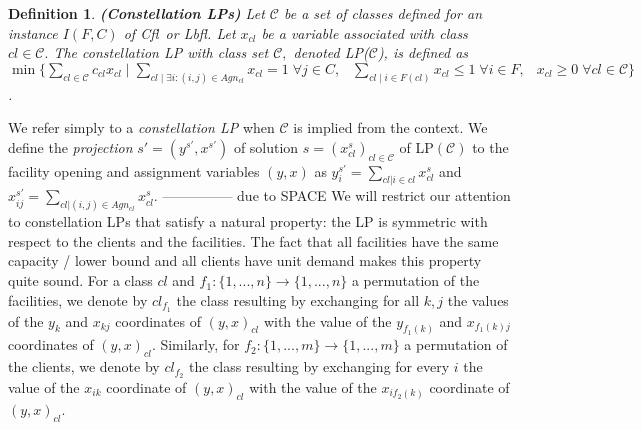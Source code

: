 \documentclass[11pt]{article}
\newtheorem{definition}{Definition}[section]
\newcommand{\lbfl}{{\sc Lbfl}}
\newcommand{\cfl}{{\sc Cfl}}
\begin{document}
\vspace*{-0.05cm}
\begin{sloppypar}
\begin{definition}  {\bf (Constellation LPs)} \label{def:constell}
Let $\mathcal{C}$ be a set of classes defined for an instance $I(F,C)$
of \cfl\ or \lbfl. Let $x_{cl}$  be a variable associated with class $cl \in
\mathcal{C}.$
The {\em  constellation LP with class set}
  $\mathcal{C},$ denoted LP($\mathcal{C}$),  is defined as $\min \{
\sum_{cl \in \mathcal{C}} c_{cl}x_{cl} \mid \sum_{{cl} \mid  \exists
  i:(i,j) \in  Agn_{cl}} x_{cl}=1  \; \forall j \in C, \:\;\; \sum_{{cl} \mid
  i  \in  F({cl})} x_{cl} \leq 1 \; \forall i \in F,  \:\;\;  x_{cl} \geq 0
\; \forall cl \in \mathcal{C} \}$.


\begin{comment}
\[ \min \{ \sum_{cl \in \mathcal{C}} c_{cl}x_{cl}  \mid \sum_{{cl} \mid  \exists i:(i,j) \in  Agn_{cl}}
x_{cl}=1  \; \forall j \in C,   \;\;\; 
\sum_{{cl} \mid  i  \in  F({cl})} x_{cl} \leq 1 
\; \forall i \in F,  \;\;\;  
 x_{cl} \geq 0   \; \forall cl \in \mathcal{C}  \}
\]
\end{comment}
\end{definition}
\end{sloppypar}
\vspace*{-0.03cm}


\noindent 
We  refer simply to a {\em constellation LP} when
$\mathcal{C}$ is implied from the context.  
We define the \emph{projection} $s'=(y^{s'}, x^{s'})$ of solution $s=(x^s_{cl})_{cl \in \mathcal{C}}$ 
of  LP$(\mathcal{C})$ to the  facility opening
and assignment variables $(y,x)$ as $y_i^{s'}=\sum_{cl|i\in cl}x_{cl}^{s}$ and 
$x_{ij}^{s'}=\sum_{cl| (i,j) \in Agn_{cl}}x_{cl}^{s}$.
\iffalse --------------- due to SPACE
We will restrict our attention to  constellation LPs that satisfy a  natural property:   the LP is symmetric
 with respect to the clients and  the  facilities. 
The fact  that all facilities have the  same capacity / lower bound and all
clients have unit demand makes  this  property quite sound. 
For a class   $cl$ and
$f_1: \{1,...,n \} \rightarrow \{1,...,n \}$ a permutation of the facilities, we denote by $cl_{f_1}$
the class resulting by exchanging  for all $k, j$ the values  of the $y_{k}$  and
$x_{kj}$ coordinates 
of $(y,x)_{cl}$  with   the value of  the $y_{f_1(k)}$  and $x_{f_1(k)j}$ coordinates of
$(y,x)_{cl}$. Similarly,  for $f_2: \{1,...,  m\} \rightarrow \{1,...,
m\}$ a permutation of the clients, we denote  by $cl_{f_2}$ the class resulting  by exchanging for
every $i$  the value of  the $x_{ik}$ coordinate of  $(y,x)_{cl}$ with
 the value of the $x_{if_2(k)}$ coordinate of $(y,x)_{cl}$.
\end{document}
